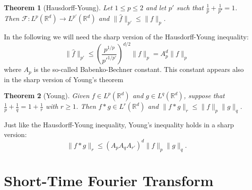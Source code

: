 \documentclass[corpo=11pt, stile=classica, tipotesi=custom,
greek, evenboxes, english]{toptesi}
\numberwithin{equation}{chapter}
\newtheorem{teo}{Theorem}[chapter] %
\theoremstyle{remark}
\newcommand{\R}{\mathbb{R}} %
\newcommand{\F}{\mathscr{F}} %
\begin{document}
\begin{teo}[Hausdorff-Young]
	Let $1 \leq p \leq 2$ and let $p'$ such that $\frac{1}{p} + \frac{1}{p'} = 1$. Then $\F : L^p(\R^d) \rightarrow L^{p'}(\R^d)$ and $\| \hat{f }\|_{p'} \leq \| f \|_p$.
\end{teo}
In the following we will need the sharp version of the Hausdorff-Young inequality: 
\begin{equation}\label{Hausdorff-Yound inequality}
	\| \hat{f} \|_{p'} \leq \left(\dfrac{p^{1/p}}{p'^{1/p'}}\right)^{d/2} \|f\|_p = A_p^d \|f\|_p
\end{equation}
where $A_p$ is the so-called Babenko-Bechner constant. This constant appears also in the sharp version of Young's theorem
\begin{teo}[Young]\label{Young theorem}
	Given $f \in L^p(\R^d)$ and $g \in L^q(\R^d)$, suppose that $\frac{1}{p}+\frac{1}{q}=1+\frac{1}{r}$ with $r \geq 1$. Then $f * g \in L^r(\R^d)$ and $\|f * g\|_r \leq \|f\|_p \|g\|_q$.
\end{teo}
Just like the Hausdorff-Young inequality, Young's inequality holds in a sharp version:
\begin{equation}\label{Young inequality sharp}
	\|f * g\|_r \leq (A_p A_q A_{r'})^d \|f\|_p \|g\|_q.
\end{equation}


\chapter{Short-Time Fourier Transform}\label{chapter STFT}
\end{document}
